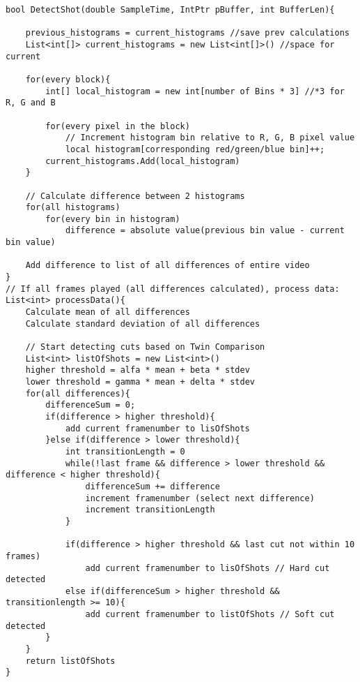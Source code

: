 \begin{lstlisting}[frame=single]
bool DetectShot(double SampleTime, IntPtr pBuffer, int BufferLen){
	
	previous_histograms = current_histograms //save prev calculations
	List<int[]> current_histograms = new List<int[]>() //space for current
	
	for(every block){
        int[] local_histogram = new int[number of Bins * 3] //*3 for R, G and B
        
        for(every pixel in the block)
            // Increment histogram bin relative to R, G, B pixel value
            local histogram[corresponding red/green/blue bin]++;
        current_histograms.Add(local_histogram)
	}
	
	// Calculate difference between 2 histograms
	for(all histograms)
	    for(every bin in histogram)
	        difference = absolute value(previous bin value - current bin value)   

    Add difference to list of all differences of entire video
}
// If all frames played (all differences calculated), process data:
List<int> processData(){
    Calculate mean of all differences
    Calculate standard deviation of all differences
    
    // Start detecting cuts based on Twin Comparison
    List<int> listOfShots = new List<int>()
    higher threshold = alfa * mean + beta * stdev
    lower threshold = gamma * mean + delta * stdev
    for(all differences){
        differenceSum = 0;
        if(difference > higher threshold){
            add current framenumber to lisOfShots
        }else if(difference > lower threshold){
            int transitionLength = 0
            while(!last frame && difference > lower threshold && difference < higher threshold){
                differenceSum += difference
                increment framenumber (select next difference) 
                increment transitionLength
            }
            
            if(difference > higher threshold && last cut not within 10 frames)
                add current framenumber to lisOfShots // Hard cut detected
            else if(differenceSum > higher threshold && transitionlength >= 10){
                add current framenumber to listOfShots // Soft cut detected
        }
    }
    return listOfShots
}
\end{lstlisting}
\\